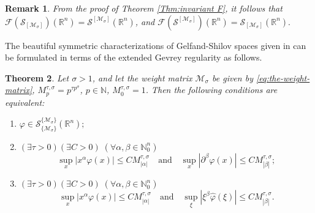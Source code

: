 \documentclass{article}
\theoremstyle{thmstyleone}
\newtheorem{Theorem}{Theorem}[section]%
\theoremstyle{thmstyletwo}%
\newtheorem{Remark}[Theorem]{Remark}%
\theoremstyle{thmstylethree}%
\begin{document}
\begin{Remark}
From the proof of Theorem \ref{Thm:invariant F}, it follows that
$\mathcal{F} (\mathcal S_{[\mathcal{M}_\sigma]})(\mathbb R^n)= \mathcal S^{[\mathcal{M}_\sigma]} (\mathbb R^n)$, and $\mathcal{F} (\mathcal S^{[\mathcal{M}_\sigma]}) (\mathbb R^n)= \mathcal S_{[\mathcal{M}_\sigma]} (\mathbb R^n).$
\end{Remark}


The beautiful symmetric characterizations of 
Gelfand-Shilov spaces given in  \cite{Chung 1996} 
can be formulated in terms of the extended Gevrey regularity as follows. 

\begin{Theorem} \label{Thm:opisFurije}
Let $\sigma>1$,  and let the weight matrix $\mathcal{M}_\sigma$ be given by \eqref{eq:the-weight-matrix}, 
$ M_{p}^{\tau,\sigma}=p^{\tau p^\sigma}$, $ p\in \mathbb{N}$, $ M_0^{\tau,\sigma}=1$.
Then the following conditions are equivalent:
    \begin{enumerate}
        \item $\varphi\in \mathcal  S_{\{\mathcal{M}_\sigma\}}^{\{\mathcal{M}_\sigma\}} (\mathbb R^n);$
        \item $(\exists \tau>0)(\exists C>0)\;(\forall \alpha,\beta\in \mathbb N_0^n)$
        $$\sup_x|x^\alpha \varphi(x)|\leq C M^{\tau,\sigma}_{|\alpha|} \quad \text{and}\quad \sup_x|\partial^\beta \varphi(x)|\leq CM^{\tau,\sigma}_{|\beta|};$$
        \item $(\exists \tau>0)(\exists C>0)\;(\forall \alpha,\beta\in \mathbb N_0^n)$
        $$\sup_x|x^\alpha \varphi(x)|\leq C M^{\tau,\sigma}_{|\alpha|} \quad \text{and}\quad \sup_\xi|\xi^\beta \widehat\varphi(\xi)|\leq CM^{\tau,\sigma}_{|\beta|}.$$
    \end{enumerate}
\end{Theorem}
\end{document}
